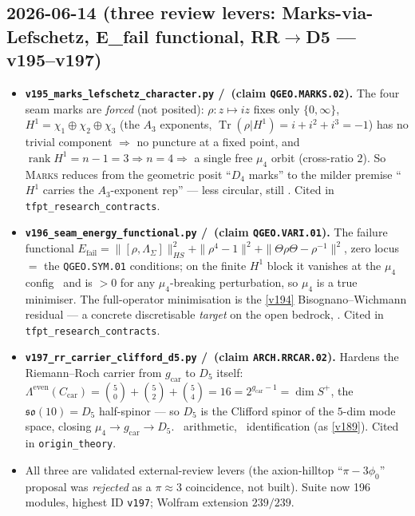 \subsection*{2026-06-14 (three review levers: Marks-via-Lefschetz, E\_fail functional, RR$\to$D5 --- v195--v197)}
\begin{itemize}
\item \textbf{\texttt{v195\_marks\_lefschetz\_character.py} \mE/\mO\ (claim \texttt{QGEO.MARKS.02}).} The four
  seam marks are \emph{forced} (not posited): $\rho{:}z\mapsto iz$ fixes only $\{0,\infty\}$, $H^1=
  \chi_1{\oplus}\chi_2{\oplus}\chi_3$ (the $A_3$ exponents, $\operatorname{Tr}(\rho|H^1)=i{+}i^2{+}i^3={-}1$)
  has no trivial component $\Rightarrow$ no puncture at a fixed point, and $\operatorname{rank}H^1=n{-}1=3
  \Rightarrow n=4 \Rightarrow$ a single free $\mu_4$ orbit (cross-ratio $2$). So \textsc{Marks} reduces from
  the geometric posit ``$D_4$ marks'' to the milder premise ``$H^1$ carries the $A_3$-exponent rep'' ---
  less circular, still \mO. Cited in \texttt{tfpt\_research\_contracts}.
\item \textbf{\texttt{v196\_seam\_energy\_functional.py} \mE/\mO\ (claim \texttt{QGEO.VARI.01}).} The
  failure functional $E_{\mathrm{fail}}=\|[\rho,\Lambda_\Sigma]\|^2_{HS}+\|\rho^4{-}1\|^2+\|\Theta\rho\Theta-\rho^{-1}\|^2$,
  zero locus $=$ the \texttt{QGEO.SYM.01} conditions; on the finite $H^1$ block it vanishes at the $\mu_4$
  config \mE\ and is $>0$ for any $\mu_4$-breaking perturbation, so $\mu_4$ is a true minimiser. The
  full-operator minimisation is the \vref{v194} Bisognano--Wichmann residual --- a concrete discretisable
  \emph{target} on the open bedrock, \mO. Cited in \texttt{tfpt\_research\_contracts}.
\item \textbf{\texttt{v197\_rr\_carrier\_clifford\_d5.py} \mE/\mC\ (claim \texttt{ARCH.RRCAR.02}).} Hardens
  the Riemann--Roch carrier from $g_{\mathrm{car}}$ to $D_5$ itself: $\Lambda^{\mathrm{even}}(C_{\mathrm{car}})
  =\binom50{+}\binom52{+}\binom54=16=2^{g_{\mathrm{car}}-1}=\dim S^+$, the $\mathfrak{so}(10)=D_5$
  half-spinor --- so $D_5$ is the Clifford spinor of the $5$-dim mode space, closing $\mu_4{\to}g_{\mathrm{car}}{\to}D_5$.
  \mE\ arithmetic, \mC\ identification (as \vref{v189}). Cited in \texttt{origin\_theory}.
\item All three are validated external-review levers (the axion-hilltop ``$\pi-3\phi_0$'' proposal was
  \emph{rejected} as a $\pi\approx3$ coincidence, not built). Suite now 196 modules, highest ID
  \texttt{v197}; Wolfram extension $239/239$.
\end{itemize}

